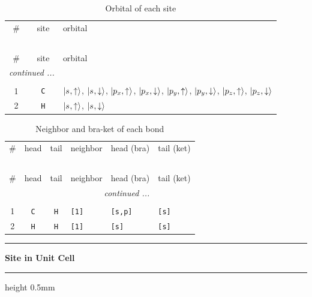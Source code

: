 \documentclass[fleqn,10pt,landscape]{jsarticle}
\begin{document}
\renewcommand{\arraystretch}{1.6}
\begin{longtable}[l]{ccl}
\captionsetup{justification=raggedright, singlelinecheck=off}
\caption{Orbital of each site}
 \\
 \hline \hline
\# & site & orbital \\ \hline \endfirsthead

\multicolumn{2}{l}{\tablename\ \thetable{}} \\
 \hline \hline
\# & site & orbital \\ \hline \endhead

 \hline \hline
\multicolumn{2}{r}{\footnotesize\it continued ...} \\ \endfoot

 \hline \hline
\multicolumn{2}{r}{} \\ \endlastfoot

1 & \texttt{C} & $\ket{s_{},\uparrow}$, $\ket{s_{},\downarrow}$, $\ket{p_{x},\uparrow}$, $\ket{p_{x},\downarrow}$, $\ket{p_{y},\uparrow}$, $\ket{p_{y},\downarrow}$, $\ket{p_{z},\uparrow}$, $\ket{p_{z},\downarrow}$ \\ \hline
2 & \texttt{H} & $\ket{s_{},\uparrow}$, $\ket{s_{},\downarrow}$ \\
\end{longtable}
\renewcommand{\arraystretch}{1.6}
\begin{longtable}[l]{ccclll}
\captionsetup{justification=raggedright, singlelinecheck=off}
\caption{Neighbor and bra-ket of each bond}
 \\
 \hline \hline
\# & head & tail & neighbor & head (bra) & tail (ket) \\ \hline \endfirsthead

\multicolumn{5}{l}{\tablename\ \thetable{}} \\
 \hline \hline
\# & head & tail & neighbor & head (bra) & tail (ket) \\ \hline \endhead

 \hline \hline
\multicolumn{5}{r}{\footnotesize\it continued ...} \\ \endfoot

 \hline \hline
\multicolumn{5}{r}{} \\ \endlastfoot

1 & \texttt{C} & \texttt{H} & \texttt{[1]} & \texttt{[s,p]} & \texttt{[s]} \\ \hline
2 & \texttt{H} & \texttt{H} & \texttt{[1]} & \texttt{[s]} & \texttt{[s]} \\
\end{longtable}
\vspace{5mm}
\noindent \rule[0.5mm]{5mm}{0.5mm}\hspace{3mm}\textbf{Site in Unit Cell}\hspace{3mm}\leaders\hrule height 0.5mm\hfill\kern0pt
\vspace{3mm}
\end{document}
